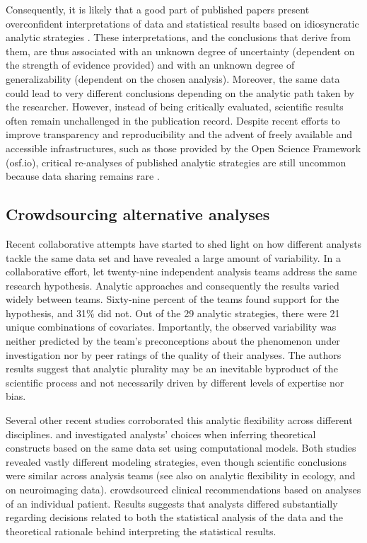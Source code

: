 \documentclass[Review,times,sageh]{sagej}
\begin{document}
Consequently, it is likely that a good part of published papers present overconfident interpretations of data and statistical results based on idiosyncratic analytic strategies \citep[e.g.,][]{simmons2011false, gelman2014statistical}.
These interpretations, and the conclusions that derive from them, are thus associated with an unknown degree of uncertainty (dependent on the strength of evidence provided) and with an unknown degree of generalizability (dependent on the chosen analysis).
Moreover, the same data could lead to very different conclusions depending on the analytic path taken by the researcher.
However, instead of being critically evaluated, scientific results often remain unchallenged in the publication record.
Despite recent efforts to improve transparency and reproducibility \citep[e.g.~][]{miguel2014promoting, klein2018practical} and the advent of freely available and accessible infrastructures, such as those provided by the Open Science Framework (osf.io), critical re-analyses of published analytic strategies are still uncommon because data sharing remains rare \citep{wicherts2006poor}.

\hypertarget{crowdsourcing-alternative-analyses}{%
\subsection{Crowdsourcing alternative analyses}\label{crowdsourcing-alternative-analyses}}

Recent collaborative attempts have started to shed light on how different analysts tackle the same data set and have revealed a large amount of variability.
In a collaborative effort, \citet{silberzahn2018many} let twenty-nine independent analysis teams address the same research hypothesis.
Analytic approaches and consequently the results varied widely between teams.
Sixty-nine percent of the teams found support for the hypothesis, and 31\% did not.
Out of the 29 analytic strategies, there were 21 unique combinations of covariates.
Importantly, the observed variability was neither predicted by the team's preconceptions about the phenomenon under investigation nor by peer ratings of the quality of their analyses.
The authors results suggest that analytic plurality may be an inevitable byproduct of the scientific process and not necessarily driven by different levels of expertise nor bias.

Several other recent studies corroborated this analytic flexibility across different disciplines.
\citet{dutilh2019} and \citet{starns2019assessing} investigated analysts' choices when inferring theoretical constructs based on the same data set using computational models.
Both studies revealed vastly different modeling strategies, even though scientific conclusions were similar across analysis teams (see also \citet{Parker2020} on analytic flexibility in ecology, and \citet{botvinik-nezer2020} on neuroimaging data).
\citet{bastiaansen2020} crowdsourced clinical recommendations based on analyses of an individual patient.
Results suggests that analysts differed substantially regarding decisions related to both the statistical analysis of the data and the theoretical rationale behind interpreting the statistical results.
\end{document}

